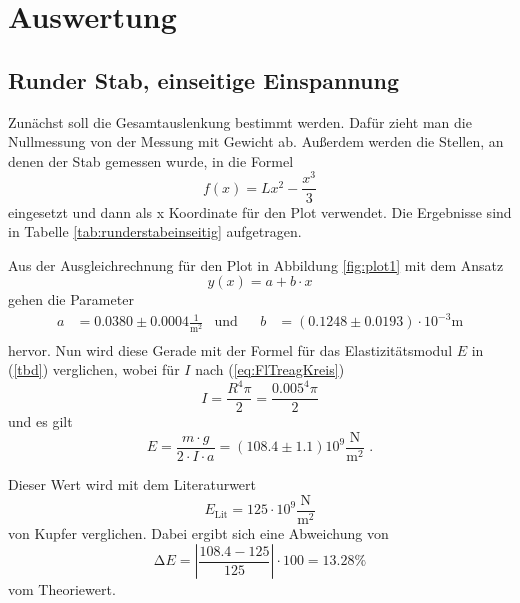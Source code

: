 \section{Auswertung}
\label{sec:Auswertung}

\subsection{Runder Stab, einseitige Einspannung}
Zunächst soll die Gesamtauslenkung bestimmt werden.
Dafür zieht man die Nullmessung von der Messung mit Gewicht ab.
Außerdem werden die Stellen, an denen der Stab gemessen wurde, in die Formel 
\begin{equation}
  f(x) = Lx^2 - \frac{x^3}{3}
\end{equation}
eingesetzt und dann als x Koordinate für den Plot verwendet.
Die Ergebnisse sind in Tabelle \ref{tab:runderstabeinseitig} aufgetragen.

Aus der Ausgleichrechnung für den Plot in Abbildung \ref{fig:plot1} mit dem Ansatz
\begin{equation*}
  y(x) = a + b \cdot x
\end{equation*}
gehen die Parameter
\begin{align*}
  a &= 0.0380 ± 0.0004 \frac{1}{\unit{\meter\squared}} & \text{und}& & b&= (0.1248 ± 0.0193) \cdot 10^{-3} \unit\meter\\
\end{align*}
hervor. Nun wird diese Gerade mit der Formel für das Elastizitätsmodul $E$ in (\ref{tbd}) verglichen, wobei für $I$ nach (\ref{eq:FlTreagKreis})
\begin{equation*}
  I = \frac{R^4 \pi}{2} = \frac{0.005^4 \pi}{2}
\end{equation*}
und es gilt
\begin{equation*}
  E = \frac{m \cdot g} {2 \cdot I \cdot a} = (108.4 \pm 1.1) 10^9 \frac{\unit\newton}{\unit\meter^2} \text{ .}
\end{equation*}

Dieser Wert wird mit dem Literaturwert {\cite{demtroeder1}}
\begin{equation*}
  E_\text{Lit} = 125 \cdot 10^9 \frac{\unit\newton}{\unit\meter^2}
\end{equation*}
von Kupfer verglichen. Dabei ergibt sich eine Abweichung von
\begin{equation*}
  \increment E = \left|\frac{108.4 - 125}{125}\right| \cdot 100 = 13.28 \%
\end{equation*}
vom Theoriewert.


